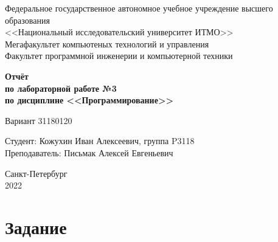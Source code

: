 \documentclass[12pt]{article}
\begin{document}
\setcounter{page}{0}
\thispagestyle{empty}

\begin{center}
    Федеральное государственное автономное учебное учреждение высшего образования\\
    <<Национальный исследовательский университет ИТМО>>\\
\vspace{0.5cm}
    Мегафакультет компьютеных технологий и управления\\
    Факультет программной инженерии и компьютерной техники
\end{center}

\vspace{3cm}

\begin{center}
\Large
\textbf{
    Отчёт\\
    по лабораторной работе №3\\
    по дисциплине <<Программирование>>
}
\end{center}

\begin{center}
\large
    Вариант 31180120
\end{center}

\vspace{6cm}

\begin{flushright}
    Студент: Кожухин Иван Алексеевич, группа P3118\\
    Преподаватель: Письмак Алексей Евгеньевич
\end{flushright}

\vspace{6cm}

\begin{center}
    Санкт-Петербург\\
    2022
\end{center}

\newpage

\tableofcontents

\newpage

\section{Задание}
\end{document}
